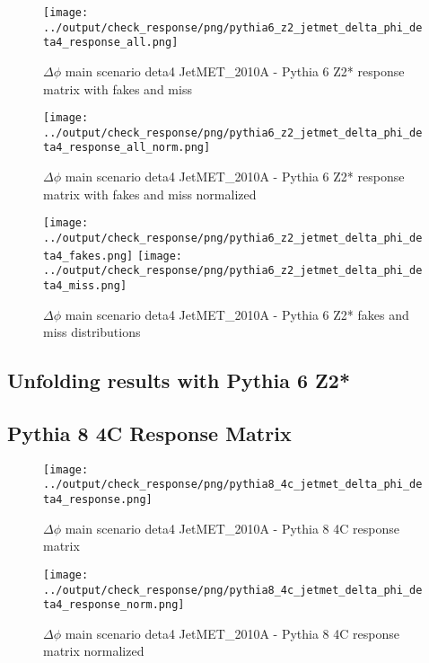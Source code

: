 \documentclass[11pt]{book}
\begin{document}
\begin{figure}[ht]
\centering
\texttt{[image: ../output/check\_response/png/pythia6\_z2\_jetmet\_delta\_phi\_deta4\_response\_all.png]}
\caption{$\Delta\phi$ main scenario deta4 JetMET\_2010A - Pythia 6 Z2* response matrix with fakes and miss}
\label{p6_jetmet_delta_phi_deta4_response_all}
\end{figure}

\begin{figure}[ht]
\centering
\texttt{[image: ../output/check\_response/png/pythia6\_z2\_jetmet\_delta\_phi\_deta4\_response\_all\_norm.png]}
\caption{$\Delta\phi$ main scenario deta4 JetMET\_2010A - Pythia 6 Z2* response matrix with fakes and miss normalized}
\label{p6_jetmet_delta_phi_deta4_response_all_norm}
\end{figure}

\begin{figure}[ht]
\centering
\texttt{[image: ../output/check\_response/png/pythia6\_z2\_jetmet\_delta\_phi\_deta4\_fakes.png]}
\texttt{[image: ../output/check\_response/png/pythia6\_z2\_jetmet\_delta\_phi\_deta4\_miss.png]}
\caption{$\Delta\phi$ main scenario deta4 JetMET\_2010A - Pythia 6 Z2* fakes and miss distributions}
\label{p6_jetmet_delta_phi_deta4_fakesmiss}
\end{figure}


\clearpage
\subsection{Unfolding results with Pythia 6 Z2*}


\clearpage
\subsection{Pythia 8 4C Response Matrix}


\begin{figure}[ht]
\centering
\texttt{[image: ../output/check\_response/png/pythia8\_4c\_jetmet\_delta\_phi\_deta4\_response.png]}
\caption{$\Delta\phi$ main scenario deta4 JetMET\_2010A - Pythia 8 4C response matrix}
\label{p8_jetmet_delta_phi_deta4_response}
\end{figure}

\begin{figure}[ht]
\centering
\texttt{[image: ../output/check\_response/png/pythia8\_4c\_jetmet\_delta\_phi\_deta4\_response\_norm.png]}
\caption{$\Delta\phi$ main scenario deta4 JetMET\_2010A - Pythia 8 4C response matrix normalized}
\label{p8_jetmet_delta_phi_deta4_response_norm}
\end{figure}
\end{document}
